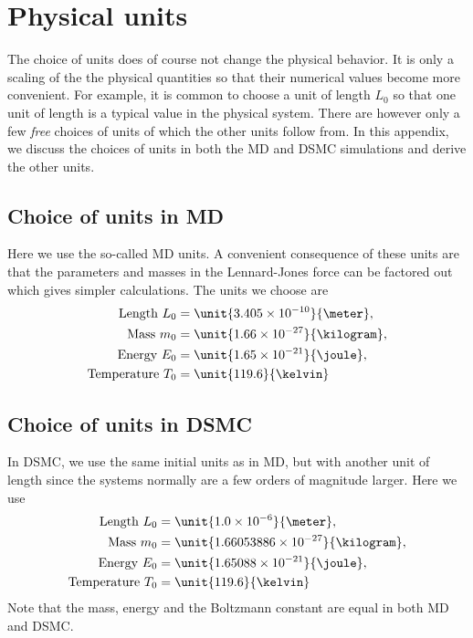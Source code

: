 \chapter{Physical units}
\label{app:physical_units}
The choice of units does of course not change the physical behavior. It is only a scaling of the the physical quantities so that their numerical values become more convenient. For example, it is common to choose a unit of length $L_0$ so that one unit of length is a typical value in the physical system. There are however only a few \textit{free} choices of units of which the other units follow from. In this appendix, we discuss the choices of units in both the MD and DSMC simulations and derive the other units.
\section{Choice of units in MD}
Here we use the so-called MD units. A convenient consequence of these units are that the parameters and masses in the Lennard-Jones force can be factored out which gives simpler calculations. The units we choose are
\begin{align}
	\text{Length } L_0 &= \unit{3.405\e{-10}}{\meter},\\
	\text{Mass } m_0 &= \unit{1.66\e{-27}}{\kilogram},\\
	\text{Energy } E_0 &= \unit{1.65\e{-21}}{\joule},\\
	\text{Temperature } T_0 &= \unit{119.6}{\kelvin}
\end{align}
\section{Choice of units in DSMC}
In DSMC, we use the same initial units as in MD, but with another unit of length since the systems normally are a few orders of magnitude larger. Here we use
\begin{align}
	\text{Length } L_0 &= \unit{1.0\e{-6}}{\meter},\\
	\text{Mass } m_0 &= \unit{1.66053886\e{-27}}{\kilogram},\\
	\text{Energy } E_0 &= \unit{1.65088\e{-21}}{\joule},\\
	\text{Temperature } T_0 &= \unit{119.6}{\kelvin}
\end{align}
Note that the mass, energy and the Boltzmann constant are equal in both MD and DSMC. 
